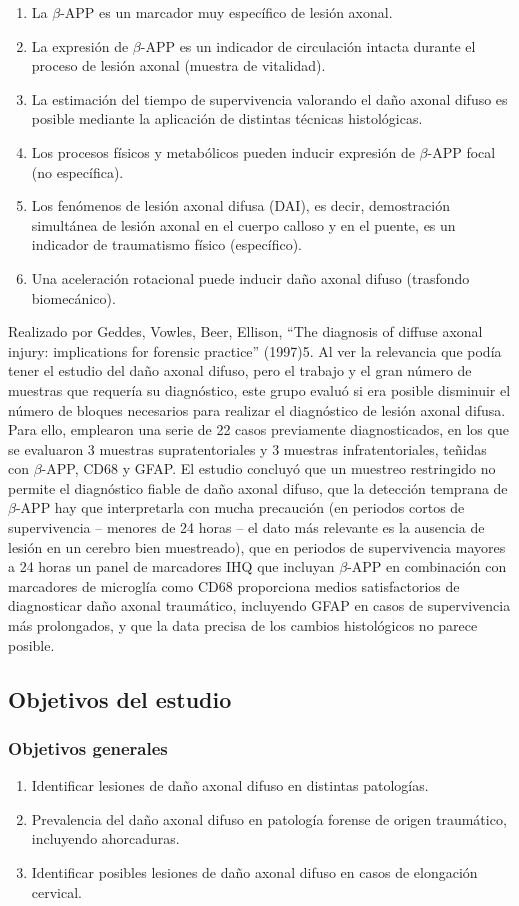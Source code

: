\begin{enumerate}
	\item La $\beta$-APP es un marcador muy específico de lesión axonal.
	\item La expresión de $\beta$-APP es un indicador de circulación intacta durante el proceso de lesión axonal (muestra de vitalidad). 
	\item La estimación del tiempo de supervivencia valorando el daño axonal difuso es posible mediante la aplicación de distintas técnicas histológicas.
	\item Los procesos físicos y metabólicos pueden inducir expresión de $\beta$-APP focal (no específica). 
	\item Los fenómenos de lesión axonal difusa (DAI), es decir, demostración simultánea de lesión axonal en el cuerpo calloso y en el puente, es un indicador de traumatismo físico (específico). 
	\item Una aceleración rotacional puede inducir daño axonal difuso (trasfondo biomecánico). 
\end{enumerate}
Realizado por Geddes, Vowles, Beer, Ellison, “The diagnosis of diffuse axonal injury: implications for forensic practice” (1997)5. Al ver la relevancia que podía tener el estudio del daño axonal difuso, pero el trabajo y el gran número de muestras que requería su diagnóstico, este grupo evaluó si era posible disminuir el número de bloques necesarios para realizar el diagnóstico de lesión axonal difusa. Para ello, emplearon una serie de 22 casos previamente diagnosticados, en los que se evaluaron 3 muestras supratentoriales y 3 muestras infratentoriales, teñidas con $\beta$-APP, CD68 y GFAP. El estudio concluyó que un muestreo restringido no permite el diagnóstico fiable de daño axonal difuso, que la detección temprana de $\beta$-APP hay que interpretarla con mucha precaución (en periodos cortos de supervivencia – menores de 24 horas – el dato más relevante es la ausencia de lesión en un cerebro bien muestreado), que en periodos de supervivencia mayores a 24 horas un panel de marcadores IHQ que incluyan $\beta$-APP en combinación con marcadores de microglía como CD68 proporciona medios satisfactorios de diagnosticar daño axonal traumático, incluyendo GFAP en casos de supervivencia más prolongados, y que la data precisa de los cambios histológicos no parece posible.
\subsection{Objetivos del estudio}
\subsubsection{Objetivos generales}
\begin{enumerate}
	\item Identificar lesiones de daño axonal difuso en distintas patologías.
	\item Prevalencia del daño axonal difuso en patología forense de origen traumático, incluyendo ahorcaduras.
	\item Identificar posibles lesiones de daño axonal difuso en casos de elongación cervical. 
	
\end{enumerate}
